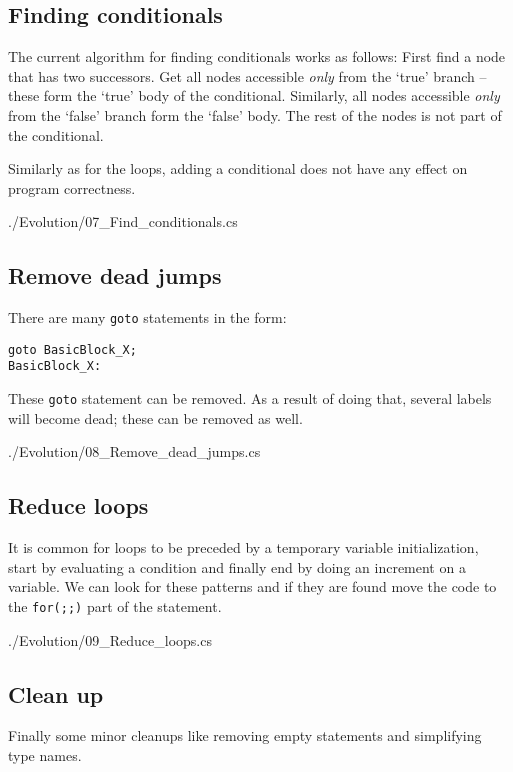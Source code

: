 \documentclass[12pt]{article}
\begin{document}
\newpage
\subsection*{Finding conditionals}

The current algorithm for finding conditionals works as follows:
First find a node that has two successors.  Get all nodes accessible
\emph{only} from the `true' branch -- these form the `true' body of
the conditional.  Similarly, all nodes accessible \emph{only} from the 
`false' branch form the `false' body.  The rest of the nodes is
not part of the conditional.

Similarly as for the loops, adding a conditional does not have any
effect on program correctness.


{./Evolution/07_Find_conditionals.cs}

\newpage
\subsection*{Remove dead jumps}

There are many \verb|goto| statements in the form:
\begin{verbatim}
goto BasicBlock_X;
BasicBlock_X:
\end{verbatim}
These \verb|goto| statement can be removed.  As a result of 
doing that, several labels will become dead; these can be
removed as well.


{./Evolution/08_Remove_dead_jumps.cs}

\newpage
\subsection*{Reduce loops}

It is common for loops to be preceded by a temporary variable
initialization, start by evaluating a condition and finally
end by doing an increment on a variable.  We can look
for these patterns and if they are found move the code 
to the \verb|for(;;)| part of the statement.


{./Evolution/09_Reduce_loops.cs}

\newpage
\subsection*{Clean up}

Finally some minor cleanups like removing empty statements and
simplifying type names.
\end{document}
